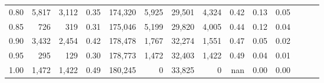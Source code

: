 \begin{tabular}{rrrrrrrrrrrrrr}
0.80 &   5,817 &  3,112 &  0.35 &  174,320 &    5,925 &  29,501 &   4,324 &  0.42 &  0.13 &      0.05 \\
0.85 &     726 &    319 &  0.31 &  175,046 &    5,199 &  29,820 &   4,005 &  0.44 &  0.12 &      0.04 \\
0.90 &   3,432 &  2,454 &  0.42 &  178,478 &    1,767 &  32,274 &   1,551 &  0.47 &  0.05 &      0.02 \\
0.95 &     295 &    129 &  0.30 &  178,773 &    1,472 &  32,403 &   1,422 &  0.49 &  0.04 &      0.01 \\
1.00 &   1,472 &  1,422 &  0.49 &  180,245 &        0 &  33,825 &       0 &   nan &  0.00 &      0.00 \\
\bottomrule
\end{tabular}

